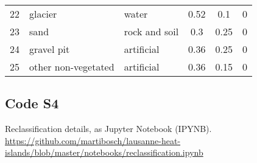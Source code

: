 \documentclass[10pt,letterpaper]{article}
\begin{document}
\begin{table}[H]
\begin{adjustwidth}{-.02\textwidth}{0cm}
\begin{center}
\begin{tabular}{ c p{} p{} c c c }
        22 & glacier & water & 0.52 & 0.1 & 0 \\
        23 & sand & rock and soil & 0.3 & 0.25 & 0 \\
        24 & gravel pit & artificial & 0.36 & 0.25 & 0 \\
        25 & other non-vegetated & artificial & 0.36 & 0.15 & 0 \\
        \bottomrule
      \end{tabular}
    \end{center}
  \end{adjustwidth}
\end{table}


\subsection*{Code S4}
\label{code-reclassification}
Reclassification details, as Jupyter Notebook (IPYNB).
\url{https://github.com/martibosch/lausanne-heat-islands/blob/master/notebooks/reclassification.ipynb}
\end{document}
